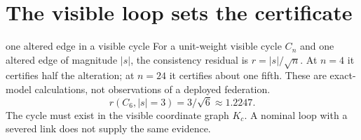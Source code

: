 \documentclass[11pt,a4paper,twoside]{article}
\begin{document}
\section*{The visible loop sets the certificate}
\begin{pdexample}{one altered edge in a visible cycle}
For a unit-weight visible cycle $C_n$ and one altered edge of magnitude $|s|$,
the consistency residual is $r=|s|/\sqrt n$. At $n=4$ it certifies half the
alteration; at $n=24$ it certifies about one fifth. These are exact-model
calculations, not observations of a deployed federation.
\[r(C_6,|s|=3)=3/\sqrt6\approx1.2247.\]
The cycle must exist in the visible coordinate graph $K_c$. A nominal loop
with a severed link does not supply the same evidence.
\end{pdexample}
\end{document}
